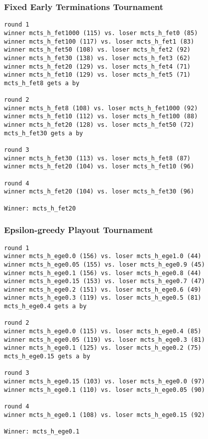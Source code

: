 \documentclass{article}
\begin{document}
\subsubsection{Fixed Early Terminations Tournament}

\begin{verbatim}
round 1
winner mcts_h_fet1000 (115) vs. loser mcts_h_fet0 (85)
winner mcts_h_fet100 (117) vs. loser mcts_h_fet1 (83)
winner mcts_h_fet50 (108) vs. loser mcts_h_fet2 (92)
winner mcts_h_fet30 (138) vs. loser mcts_h_fet3 (62)
winner mcts_h_fet20 (129) vs. loser mcts_h_fet4 (71)
winner mcts_h_fet10 (129) vs. loser mcts_h_fet5 (71)
mcts_h_fet8 gets a by

round 2
winner mcts_h_fet8 (108) vs. loser mcts_h_fet1000 (92)
winner mcts_h_fet10 (112) vs. loser mcts_h_fet100 (88)
winner mcts_h_fet20 (128) vs. loser mcts_h_fet50 (72)
mcts_h_fet30 gets a by

round 3
winner mcts_h_fet30 (113) vs. loser mcts_h_fet8 (87)
winner mcts_h_fet20 (104) vs. loser mcts_h_fet10 (96)

round 4
winner mcts_h_fet20 (104) vs. loser mcts_h_fet30 (96)

Winner: mcts_h_fet20
\end{verbatim}


\subsubsection{Epsilon-greedy Playout Tournament}

\begin{verbatim}
round 1
winner mcts_h_ege0.0 (156) vs. loser mcts_h_ege1.0 (44)
winner mcts_h_ege0.05 (155) vs. loser mcts_h_ege0.9 (45)
winner mcts_h_ege0.1 (156) vs. loser mcts_h_ege0.8 (44)
winner mcts_h_ege0.15 (153) vs. loser mcts_h_ege0.7 (47)
winner mcts_h_ege0.2 (151) vs. loser mcts_h_ege0.6 (49)
winner mcts_h_ege0.3 (119) vs. loser mcts_h_ege0.5 (81)
mcts_h_ege0.4 gets a by

round 2
winner mcts_h_ege0.0 (115) vs. loser mcts_h_ege0.4 (85)
winner mcts_h_ege0.05 (119) vs. loser mcts_h_ege0.3 (81)
winner mcts_h_ege0.1 (125) vs. loser mcts_h_ege0.2 (75)
mcts_h_ege0.15 gets a by

round 3
winner mcts_h_ege0.15 (103) vs. loser mcts_h_ege0.0 (97)
winner mcts_h_ege0.1 (110) vs. loser mcts_h_ege0.05 (90)

round 4
winner mcts_h_ege0.1 (108) vs. loser mcts_h_ege0.15 (92)

Winner: mcts_h_ege0.1
\end{verbatim}
\end{document}
